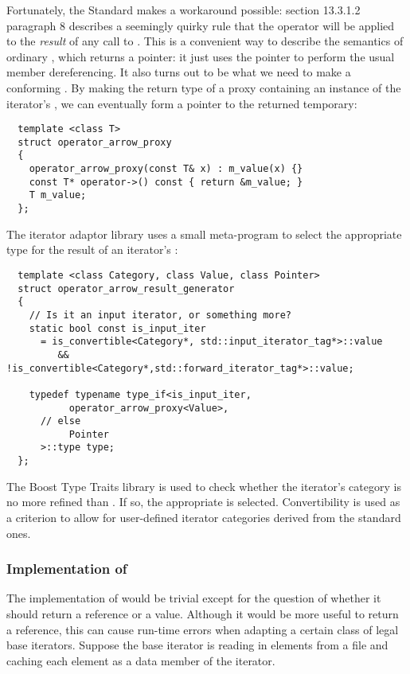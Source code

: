 \documentclass{netobjectdays}
\newcommand{\valuetype}{\code{value\_\-type}}
\begin{document}
Fortunately, the Standard makes a workaround possible: section
13.3.1.2 paragraph 8 describes a seemingly quirky rule that the
\code{->} operator will be applied to the \emph{result} of any call to
. This is a convenient way to describe the semantics
of ordinary , which returns a pointer: it just uses
the pointer to perform the usual member dereferencing. It also turns
out to be what we need to make a conforming
. By making the return type of
 a proxy containing an instance of the iterator's
\valuetype{}, we can eventually form a  pointer to the
returned temporary:

{\footnotesize
\begin{verbatim}
  template <class T>
  struct operator_arrow_proxy
  {
    operator_arrow_proxy(const T& x) : m_value(x) {}
    const T* operator->() const { return &m_value; }
    T m_value;
  };
\end{verbatim}
}

\noindent The iterator adaptor library uses a small meta-program to
select the appropriate type for the result of an iterator's
:

{\footnotesize
\begin{verbatim}
  template <class Category, class Value, class Pointer>
  struct operator_arrow_result_generator
  {
    // Is it an input iterator, or something more?
    static bool const is_input_iter
      = is_convertible<Category*, std::input_iterator_tag*>::value
         && !is_convertible<Category*,std::forward_iterator_tag*>::value;

    typedef typename type_if<is_input_iter,
           operator_arrow_proxy<Value>,
      // else
           Pointer
      >::type type;
  };
\end{verbatim}
}

The Boost Type Traits library is used to check whether the iterator's
category is no more refined than . If so,
the appropriate  is selected.
Convertibility is used as a criterion to allow for user-defined
iterator categories derived from the standard ones.


\subsubsection{Implementation of }
\label{sec:op-bracket-impl}

The implementation of  would be trivial except for
the question of whether it should return a reference or a
value. Although it would be more useful to return a reference, this
can cause run-time errors when adapting a certain class of legal base
iterators.  Suppose the base iterator is reading in elements from a
file and caching each element as a data member of the iterator.
\end{document}
